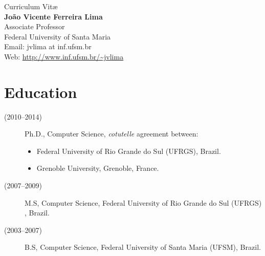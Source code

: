 \documentclass[11pt,a4paper]{article}
\begin{document}
\begin{center}
{\sc\Large Curriculum Vit\ae}\\
\vspace{2mm}
{\bf\large João Vicente Ferreira Lima}\\
\vspace{2mm}
Associate Professor\\
Federal University of Santa Maria\\
Email: jvlima at inf.ufsm.br\\
Web: {\small \url{http://www.inf.ufsm.br/~jvlima}}
\end{center}
 
\section{Education}

\begin{description}
\item[(2010--2014)] Ph.D., Computer Science, \emph{cotutelle} agreement between:
	\begin{itemize}
	\item Federal University of Rio Grande do Sul (UFRGS), Brazil.
	\item Grenoble University, Grenoble, France.
	\end{itemize}
\item[(2007--2009)] M.S, Computer Science, Federal University of Rio Grande do Sul (UFRGS) , Brazil.
\item[(2003--2007)] B.S, Computer Science, Federal University of Santa Maria (UFSM), Brazil.
\end{description}

\end{document}
